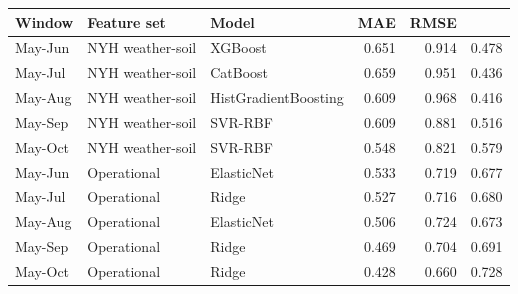 \begin{tabular}{@{}lllrrr@{}}
\toprule
Window & Feature set & Model & MAE & RMSE & \Rsq{} \\
\midrule
May-Jun & NYH weather-soil & XGBoost & 0.651 & 0.914 & 0.478 \\
May-Jul & NYH weather-soil & CatBoost & 0.659 & 0.951 & 0.436 \\
May-Aug & NYH weather-soil & HistGradientBoosting & 0.609 & 0.968 & 0.416 \\
May-Sep & NYH weather-soil & SVR-RBF & 0.609 & 0.881 & 0.516 \\
May-Oct & NYH weather-soil & SVR-RBF & 0.548 & 0.821 & 0.579 \\
May-Jun & Operational & ElasticNet & 0.533 & 0.719 & 0.677 \\
May-Jul & Operational & Ridge & 0.527 & 0.716 & 0.680 \\
May-Aug & Operational & ElasticNet & 0.506 & 0.724 & 0.673 \\
May-Sep & Operational & Ridge & 0.469 & 0.704 & 0.691 \\
May-Oct & Operational & Ridge & 0.428 & 0.660 & 0.728 \\
\bottomrule
\end{tabular}
